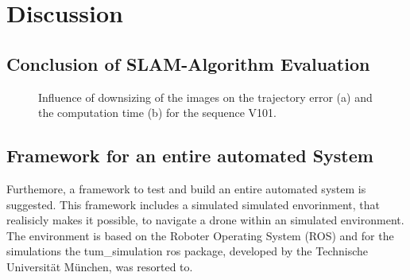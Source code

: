 \chapter{Discussion}

\section{Conclusion of SLAM-Algorithm Evaluation}



	\begin{figure}%
    \centering
	\qquad
    \caption{
	Influence of downsizing of the images on the trajectory error (a) and the computation time (b) for the sequence V101. 
	}%
    \label{fig:resolution}%
	\end{figure}



\section{Framework for an entire automated System}

	Furthemore, a framework to test and build an entire automated system is suggested. This framework includes a simulated 
	simulated envorinment, that realisicly makes it possible, to navigate a drone within an simulated environment. The environment 
	is based on the Roboter Operating System (ROS) and for the simulations the tum\_simulation ros package, developed by the Technische Universität 
	München, was resorted to. 
	
